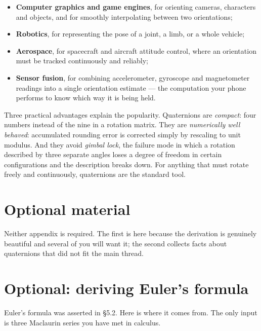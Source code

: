 \documentclass[11pt]{article}
\theoremstyle{definition}
\theoremstyle{remark}
\begin{document}
\begin{itemize}[leftmargin=1.4em,itemsep=3pt]
  \item \textbf{Computer graphics and game engines}, for orienting cameras,
        characters and objects, and for smoothly interpolating between two
        orientations;
  \item \textbf{Robotics}, for representing the pose of a joint, a limb, or a
        whole vehicle;
  \item \textbf{Aerospace}, for spacecraft and aircraft attitude control, where
        an orientation must be tracked continuously and reliably;
  \item \textbf{Sensor fusion}, for combining accelerometer, gyroscope and
        magnetometer readings into a single orientation estimate --- the
        computation your phone performs to know which way it is being held.
\end{itemize}

\noindent Three practical advantages explain the popularity. Quaternions are
\emph{compact}: four numbers instead of the nine in a rotation matrix. They are
\emph{numerically well behaved}: accumulated rounding error is corrected simply
by rescaling to unit modulus. And they avoid \emph{gimbal lock}, the failure
mode in which a rotation described by three separate angles loses a degree of
freedom in certain configurations and the description breaks down. For anything
that must rotate freely and continuously, quaternions are the standard tool.

\appendix
\section*{Optional material}
\noindent Neither appendix is required. The first is here because the derivation
is genuinely beautiful and several of you will want it; the second collects
facts about quaternions that did not fit the main thread.

\section{Optional: deriving Euler's formula}
Euler's formula was asserted in \S5.2. Here is where it comes from. The only
input is three Maclaurin series you have met in calculus.
\end{document}
